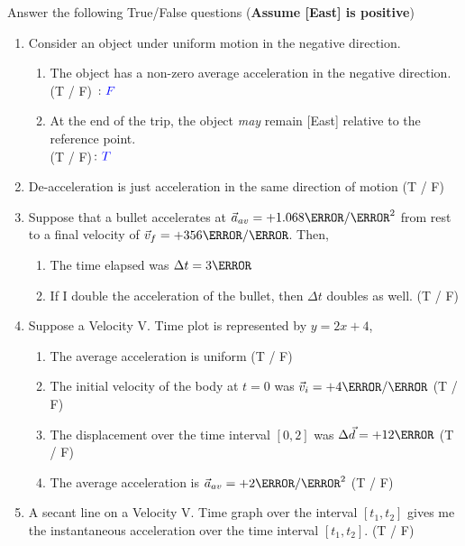 \documentclass[12pt]{article} %
\begin{document}
\begin{qstn}[1] %
    Answer the following True/False questions (\textbf{Assume [East] is positive})
    \begin{enumerate}
        \item Consider an object under uniform motion in the negative direction.
            \begin{enumerate}[label = (\alph*)]
                \item The object has a non-zero average acceleration in the negative direction. (T / F) $\colon \textcolor{blue}{F}$
                \item At the end of the trip, the object \emph{may} remain [East] relative to the reference point. \\(T / F)$\colon \textcolor{blue}{T}$
            \end{enumerate}
        \item De-acceleration is just acceleration in the same direction of motion (T / F)
        \item Suppose that a bullet accelerates at $\vec a_{av} = +1.068 \km / \s^2$ from rest to a final velocity of $\vec v_f = +356 \m / \s$. Then,
            \begin{enumerate}[label = (\alph*)]
                \item The time elapsed was $\Delta t = 3\s$
                \item If I double the acceleration of the bullet, then $\Delta t$ doubles as well. (T / F)
            \end{enumerate}
        \item Suppose a Velocity V. Time plot is represented by $y = 2x + 4$,
            \begin{enumerate}[label = (\alph*)]
                \item The average acceleration is uniform (T / F)
                \item The initial velocity of the body at $t = 0$ was $\vec v_i = +4 \m / \s$ (T / F)
                \item The displacement over the time interval $[0,2]$ was $\Delta \vec d = +12\m$ (T / F)
                \item The average acceleration is $\vec a_{av} = +2\m / \s^2$ (T / F)
            \end{enumerate}
        \item A secant line on a Velocity V. Time graph over the interval $[t_1,t_2]$ gives me the instantaneous acceleration over the time interval $[t_1,t_2]$. (T / F)

\end{enumerate}
\end{qstn}
\end{document}
